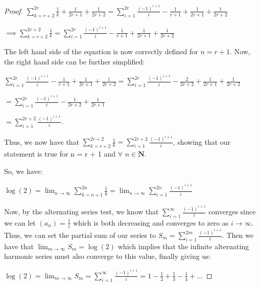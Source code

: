 \documentclass{article}
\begin{document}
\begin{proof}
$\sum_{k=r+2}^{2r} \frac{1}{k} + \frac{1}{2r+1} + \frac{1}{2r+2} = \sum_{i=1}^{2r} \frac{(-1)^{i+1}}{i} - \frac{1}{r+1} + \frac{1}{2r+1} + \frac{1}{2r+2}$

$\implies \sum_{k=r+2}^{2r+2} \frac{1}{k} = \sum_{i=1}^{2r} \frac{(-1)^{i+1}}{i} - \frac{1}{r+1} + \frac{1}{2r+1} + \frac{1}{2r+2}$

The left hand side of the equation is now correctly defined for $n = r+1$. Now, the right hand side can be further simplified:

$\sum_{i=1}^{2r} \frac{(-1)^{i+1}}{i} - \frac{1}{r+1} + \frac{1}{2r+1} + \frac{1}{2r+2} = \sum_{i=1}^{2r} \frac{(-1)^{i+1}}{i} - \frac{2}{2r+2} + \frac{1}{2r+1} + \frac{1}{2r+2}$

$= \sum_{i=1}^{2r} \frac{(-1)^{i+1}}{i} - \frac{1}{2r+2} + \frac{1}{2r+1}$

$= \sum_{i=1}^{2r+2} \frac{(-1)^{i+1}}{i}$.

Thus, we now have that $\sum_{k=r+2}^{2r+2} \frac{1}{k} = \sum_{i=1}^{2r+2} \frac{(-1)^{i+1}}{i}$, showing that our statement is true for n = r + 1 and $\forall$ $n \in \mathbf{N}$.

So, we have:

$\log(2) = \lim_{n \rightarrow \infty} \sum_{k=n+1}^{2n} \frac{1}{k} = \lim_{n \rightarrow \infty} \sum_{i=1}^{2n} \frac{(-1)^{i+1}}{i}$

Now, by the alternating series test, we know that $\sum_{i=1}^{\infty} \frac{(-1)^{i+1}}{i}$ converges since we can let $(a_n) = \frac{1}{i}$ which is both decreasing and converges to zero as $i \rightarrow \infty$. Thus, we can set the partial sum of our series to $S_m =  \sum_{i=1}^{2m} \frac{(-1)^{i+1}}{i}$. Then we have that $\lim_{m \rightarrow \infty} S_m = \log(2)$ which implies that the infinite alternating harmonic series must also converge to this value, finally giving us:

$\log(2) = \lim_{m \rightarrow \infty} S_m =  \sum_{i=1}^{\infty} \frac{(-1)^{i+1}}{i} = 1 - \frac{1}{2} + \frac{1}{3} - \frac{1}{4} + ...$

\end{proof}
\end{document}
